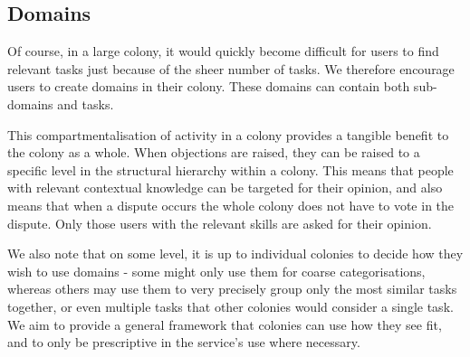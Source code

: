 \subsection{Domains}\label{sec:domains}

Of course, in a large colony, it would quickly become difficult for users to find relevant tasks just because of the sheer number of tasks. We therefore encourage users to create domains in their colony. These domains can contain both sub-domains and tasks. 

This compartmentalisation of activity in a colony provides a tangible benefit to the colony as a whole. When objections are raised, they can be raised to a specific level in the structural hierarchy within a colony. This means that people with relevant contextual knowledge can be targeted for their opinion, and also means that when a dispute occurs the whole colony does not have to vote in the dispute. Only those users with the relevant skills are asked for their opinion.

We also note that on some level, it is up to individual colonies to decide how they wish to use domains - some might only use them for coarse categorisations, whereas others may use them to very precisely group only the most similar tasks together, or even multiple tasks that other colonies would consider a single task. We aim to provide a general framework that colonies can use how they see fit, and to only be prescriptive in the service's use where necessary.

\begin{center}
\end{center}
